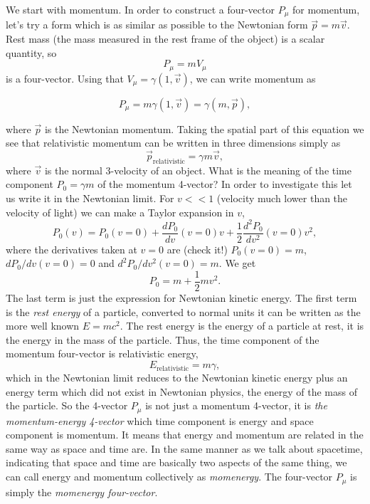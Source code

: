 {\begin{multicols}{2}
We start with momentum. In order to construct a four-vector $P_\mu$ for momentum, let's try a form which is as similar as possible to the Newtonian form $\vec{p}=m\vec{v}$. Rest mass (the mass measured in the rest frame of the object) is a scalar quantity, so
\[
P_\mu=mV_\mu
\]
is a four-vector. Using that $V_\mu=\gamma(1,\vec{v})$, we can write momentum as
\begin{formbox}
\[
P_\mu=m\gamma(1,\vec{v})=\gamma(m,\vec{p}),
\]
\end{formbox}
where $\vec{p}$ is the Newtonian momentum. Taking the spatial part of this equation we see that relativistic momentum can be written in three dimensions simply as
\begin{equation}
\label{eq:p}
\vec{p}_\mathrm{relativistic}=\gamma m \vec{v},
\end{equation}
where $\vec{v}$ is the normal 3-velocity of an object. What is the meaning of the time component $P_0=\gamma m$ of the momentum 4-vector? In order to investigate this let us write it in the Newtonian limit. For $v<<1$ (velocity much lower than the velocity of light) we can make a Taylor expansion in $v$,
\[
P_0(v)=P_0(v=0)+\frac{dP_0}{dv}(v=0)v+\frac{1}{2}\frac{d^2P_0}{dv^2}(v=0)v^2,
\]
where the derivatives taken at $v=0$ are (check it!) $P_0(v=0)=m$, $dP_0/dv(v=0)=0$ and $d^2P_0/dv^2(v=0)=m$. We get
\[
P_0=m+\frac{1}{2}mv^2.
\]
The last term is just the expression for Newtonian kinetic energy. The first term is the {\it rest energy} of a particle, converted to normal units it can be written as the more well known  $E=mc^2$. The rest energy is the energy of a particle at rest, it is the energy in the mass of the particle. Thus, the time component of the momentum four-vector is relativistic energy,
\begin{equation}
\label{eq:E}
E_\mathrm{relativistic}=m\gamma,
\end{equation}
which in the Newtonian limit reduces to the Newtonian kinetic energy plus an energy term which did not exist in Newtonian physics, the energy of the mass of the particle. So the 4-vector $P_\mu$ is not just a momentum 4-vector, it is {\it the momentum-energy 4-vector} which time component is energy and space component is momentum. It means that energy and momentum are related in the same way as space and time are. In the same manner as we talk about spacetime, indicating that space and time are basically two aspects of the same thing, we can call energy and momentum collectively as {\it momenergy\label{pg:momenergy}}. The four-vector $P_\mu$ is simply the {\it momenergy four-vector}.


\end{multicols}}
